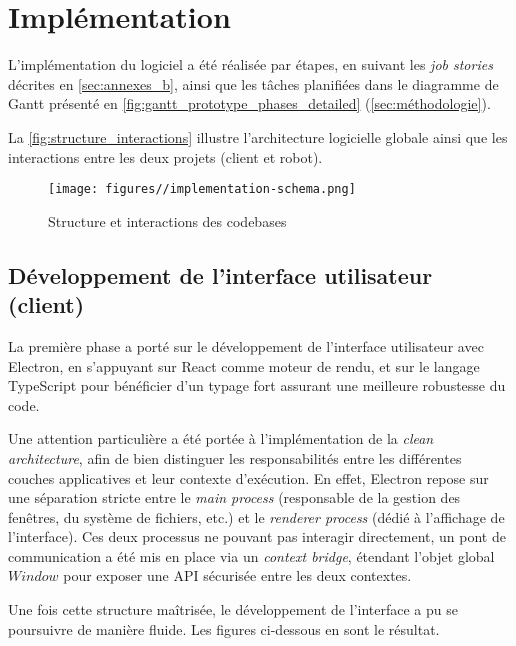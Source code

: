 \section{Implémentation}

L’implémentation du logiciel a été réalisée par étapes, en suivant les \textit{job stories} décrites en \autoref{sec:annexes_b}, ainsi que les tâches planifiées dans le diagramme de Gantt présenté en \autoref{fig:gantt_prototype_phases_detailed} (\autoref{sec:méthodologie}).

La \autoref{fig:structure_interactions} illustre l’architecture logicielle globale ainsi que les interactions entre les deux projets (client et robot).

\begin{figure}[H]
    \centering
    \texttt{[image: figures//implementation-schema.png]}
    \caption{\label{fig:structure_interactions} Structure et interactions des codebases}
\end{figure}

\subsection{Développement de l'interface utilisateur (client)}

La première phase a porté sur le développement de l’interface utilisateur avec Electron, en s’appuyant sur React comme moteur de rendu, et sur le langage TypeScript pour bénéficier d’un typage fort assurant une meilleure robustesse du code.

Une attention particulière a été portée à l’implémentation de la \textit{clean architecture}, afin de bien distinguer les responsabilités entre les différentes couches applicatives et leur contexte d’exécution.
En effet, Electron repose sur une séparation stricte entre le \textit{main process} (responsable de la gestion des fenêtres, du système de fichiers, etc.) et le \textit{renderer process} (dédié à l’affichage de l’interface).
Ces deux processus ne pouvant pas interagir directement, un pont de communication a été mis en place via un \textit{context bridge}, étendant l’objet global $Window$ pour exposer une API sécurisée entre les deux contextes.

Une fois cette structure maîtrisée, le développement de l’interface a pu se poursuivre de manière fluide.
Les figures ci-dessous en sont le résultat.

